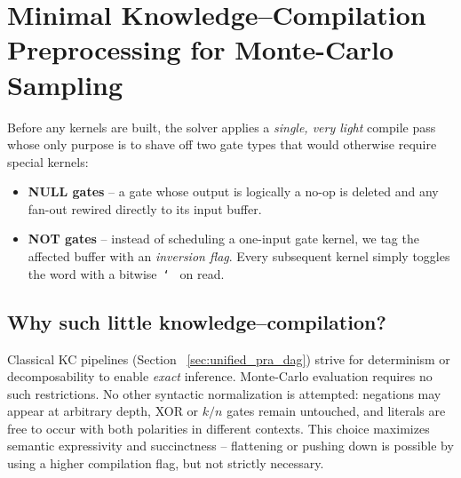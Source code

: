 \section{Minimal Knowledge–Compilation Preprocessing for Monte-Carlo Sampling}
\label{sec:mc_kc_preprocessing}

Before any kernels are built, the solver applies a \emph{single, very light} compile pass whose only purpose is to shave off two gate types that would otherwise require special kernels:
\begin{itemize}
  \item \textbf{NULL gates} – a gate whose output is logically a no-op is deleted and any fan-out rewired directly to its input buffer.
  \item \textbf{NOT gates} – instead of scheduling a one-input gate kernel, we tag the affected buffer with an \emph{inversion flag}.  Every subsequent kernel simply toggles the word with a bitwise~\texttt{\char`~} on read.
\end{itemize}

\subsection{Why such little knowledge–compilation?}  Classical KC pipelines (Section ~\ref{sec:unified_pra_dag}) strive for determinism or decomposability to enable \emph{exact} inference. Monte-Carlo evaluation requires no such restrictions. No other syntactic normalization is attempted: negations may appear at arbitrary depth, XOR or $k/n$ gates remain untouched, and literals are free to occur with both polarities in different contexts.  This choice maximizes semantic expressivity and succinctness – flattening or pushing down is possible by using a higher compilation flag, but not strictly necessary.












